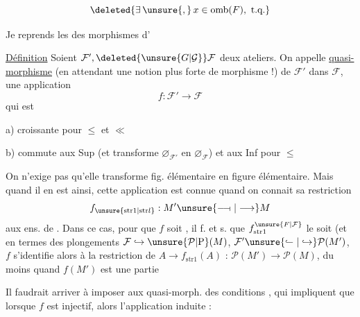 \[
\deleted{\exists\,\unsure{,}\,x\in\mathrm{omb}(F),\ \text{t.q.}}
\]
 

Je reprends les  des morphismes d'

\uline{Définition} Soient $\mathcal F',\deleted{\unsure{G|\mathcal G}}\mathcal F$ deux ateliers. On appelle  \uline{quasi-morphisme}  (en attendant une notion plus forte de morphisme !) de $\mathcal F'$ dans $\mathcal F$, une application
\[
f:\mathcal F'\longrightarrow\mathcal F
\]
qui est

a) croissante pour $\leq$ et $\ll$

b) commute aux Sup  (et transforme  $\varnothing_{\mathcal F'}$ en $\varnothing_{\mathcal F}$) et aux Inf pour $\leq$

On n'exige pas qu'elle transforme fig. élémentaire en figure élémentaire. Mais quand il en est ainsi, cette application est connue quand on connait sa restriction
\[
f_{\unsure{\mathrm{str}1|\mathrm{str}l}}:M'\unsure{\mathrel{\relbar\joinrel\relbar\joinrel\shortmid}|\longrightarrow}M
\]
aux ens. de  . Dans ce cas, pour que $f$ soit , il f. et s. que $f_{\mathrm{str}1}^{\unsure{F|\mathcal F}}$ le soit (et en termes des plongements $\mathcal F\hookrightarrow\unsure{\mathcal P|\mathrm P}(M)$, $\mathcal F'\unsure{\lhook\joinrel\relbar|\hookrightarrow}\mathcal P(M')$, $f$ s'identifie alors à la restriction  de  $A\to f_{\mathrm{str}1}(A)$ : $\mathcal P(M')\longrightarrow\mathcal P(M)$, du moins quand $f(M')$ est une partie 

Il faudrait arriver à imposer aux quasi-morph. des conditions , qui impliquent que lorsque $f$ est injectif, alors l'application induite :


